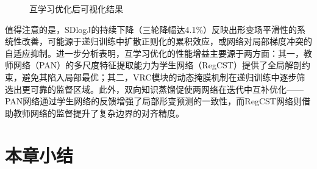 \begin{figure}[h]
    \centering
    
    \caption{互学习优化后可视化结果}\label{fig:7-2}
\end{figure}

值得注意的是，SDlogJ的持续下降（三轮降幅达4.1\%）反映出形变场平滑性的系统性改善，可能源于递归训练中扩散正则化的累积效应，或网络对局部梯度冲突的自适应抑制。进一步分析表明，互学习优化的性能增益主要源于两方面：其一，教师网络（PAN）的多尺度特征提取能力为学生网络（RegCST）提供了全局解剖约束，避免其陷入局部最优；其二，VRC模块的动态掩膜机制在递归训练中逐步筛选出更可靠的监督区域。此外，双向知识蒸馏促使两网络在迭代中互补优化——PAN网络通过学生网络的反馈增强了局部形变预测的一致性，而RegCST网络则借助教师网络的监督提升了复杂边界的对齐精度。

\section{本章小结}


